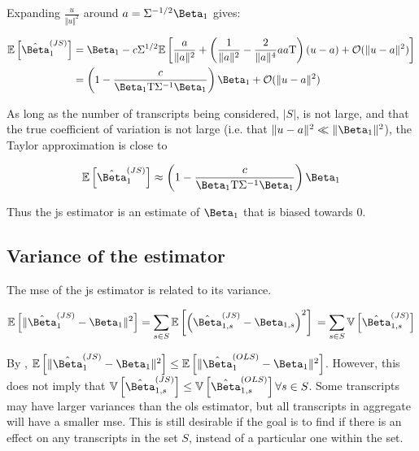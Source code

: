 Expanding $\frac{u}{\Vert u \Vert ^2}$ around $a = \Sigma^{-1/2}\Beta_1$ gives:

\begin{align*}
  \mathbb{E}\left[ \hat{\Beta}_1^{(JS)} \right]
   & = \Beta_1 - c\Sigma^{1/2}\mathbb{E} \left[ \frac{a}{\Vert a \Vert ^2} + \left( \frac{1}{\Vert a \Vert ^2}
  - \frac{2}{\Vert a \Vert ^4} aa\tran\right)(u - a) + \mathcal{O}(\Vert u - a \Vert ^2)\right]                \\
   & = \left(1 - \frac{c}{\Beta_1\tran \Sigma^{-1} \Beta_1} \right) \Beta_1
  + \mathcal{O}(\Vert u - a \Vert ^2)
\end{align*}

As long as the number of transcripts being considered, $|S|$, is not large, and that the true coefficient of variation is not large (i.e. that $\Vert u - a \Vert ^2 \ll \Vert \Beta_1 \Vert ^2$), the Taylor approximation is close to

\begin{equation}
  \mathbb{E}\left[ \hat{\Beta}_1^{(JS)} \right] \approx \left(1 - \frac{c}{\Beta_1\tran \Sigma^{-1} \Beta_1} \right) \Beta_1
\end{equation}

Thus the \gls{js} estimator is an estimate of $\Beta_1$ that is biased towards 0.

\subsection{Variance of the  estimator}

The \gls{mse} of the \gls{js} estimator is related to its variance.

\begin{equation*}
  \mathbb{E} \left[ \Vert \hat{\Beta}_1^{(JS)} - \Beta_1 \Vert ^2\right]
  = \sum_{s \in S} \mathbb{E}\left[ \left( \hat{\Beta}_{1,s}^{(JS)} - \Beta_{1,s} \right)^2 \right] \\
  = \sum_{s \in S} \mathbb{V}\left[ \hat{\Beta}_{1,s}^{(JS)} \right]
\end{equation*}

By \cite[REF][]{bockMinimaxEstimatorsMean1975}, $\mathbb{E} \left[ \Vert \hat{\Beta}_1^{(JS)} - \Beta_1 \Vert ^2\right] \le \mathbb{E} \left[ \Vert \hat{\Beta}_1^{(OLS)} - \Beta_1 \Vert ^2\right]$.
However, this does not imply that $\mathbb{V} \left[ \hat{\Beta}_{1,s}^{(JS)} \right] \le \mathbb{V} \left[ \hat{\Beta}_{1,s}^{(OLS)} \right] \forall s \in S$.
Some transcripts may have larger variances than the \gls{ols} estimator, but all transcripts in aggregate will have a smaller \gls{mse}.
This is still desirable if the goal is to find if there is an effect on any transcripts in the set $S$, instead of a particular one within the set.

